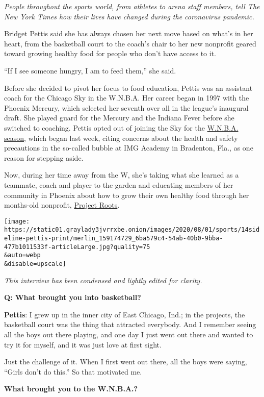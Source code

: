 \emph{People throughout the sports world, from athletes to arena staff
members, tell The New York Times how their lives have changed during the
coronavirus pandemic.}

Bridget Pettis said she has always chosen her next move based on what's
in her heart, from the basketball court to the coach's chair to her new
nonprofit geared toward growing healthy food for people who don't have
access to it.

``If I see someone hungry, I am to feed them,'' she said.

Before she decided to pivot her focus to food education, Pettis was an
assistant coach for the Chicago Sky in the W.N.B.A. Her career began in
1997 with the Phoenix Mercury, which selected her seventh over all in
the league's inaugural draft. She played guard for the Mercury and the
Indiana Fever before she switched to coaching. Pettis opted out of
joining the Sky for the
\href{https://www.nytimes3xbfgragh.onion/2020/07/23/sports/basketball/wnba-season-preview.html}{W.N.B.A.
season}, which began last week, citing concerns about the health and
safety precautions in the so-called bubble at IMG Academy in Bradenton,
Fla., as one reason for stepping aside.

Now, during her time away from the W, she's taking what she learned as a
teammate, coach and player to the garden and educating members of her
community in Phoenix about how to grow their own healthy food through
her months-old nonprofit, \href{https://www.projectrootsaz.org/}{Project
Roots}.

\texttt{[image: https://static01.graylady3jvrrxbe.onion/images/2020/08/01/sports/14sideline-pettis-print/merlin\_159174729\_6ba579c4-54ab-40b0-9bba-477b1011533f-articleLarge.jpg?quality=75\\\&auto=webp\\\&disable=upscale]}

\emph{This interview has been condensed and lightly edited for clarity.}

\textbf{Q: What brought you into basketball?}

\textbf{Pettis}: I grew up in the inner city of East Chicago, Ind.; in
the projects, the basketball court was the thing that attracted
everybody. And I remember seeing all the boys out there playing, and one
day I just went out there and wanted to try it for myself, and it was
just love at first sight.

Just the challenge of it. When I first went out there, all the boys were
saying, ``Girls don't do this.'' So that motivated me.

\textbf{What brought you to the W.N.B.A.?}


